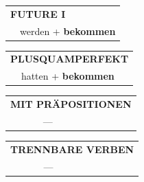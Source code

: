 \documentclass[10pt,a4paper]{revtex4-2}
\begin{document}
\begin{verbbox-acc}
\begin{tabular}{rl}
    \multicolumn{2}{l}{\textbf{FUTURE I} }\\
  &  werden + \textbf{bekommen}\\
 
  \end{tabular}
\hfill
   \begin{tabular}{rl}
      \multicolumn{2}{l}{\textbf{PLUSQUAMPERFEKT}}\\
  &  hatten + \textbf{bekommen}\\
  \end{tabular}
  
\vspace{10pt}

\begin{tabular}{lll}
\multicolumn{3}{l}{\textbf{MIT PRÄPOSITIONEN}}\\
& ---\\
\end{tabular}
\hfill
\begin{tabular}{lll}
\multicolumn{3}{l}{\textbf{TRENNBARE VERBEN}}\\
& ---\\
\end{tabular}

\vspace{-5pt}


\end{verbbox-acc}
\end{document}
